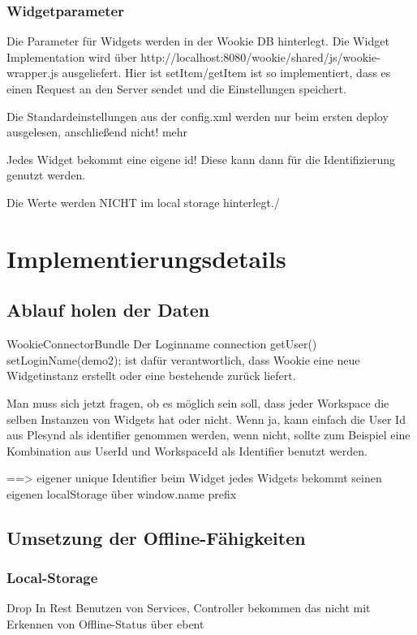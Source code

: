 \subsubsection{Widgetparameter}
Die Parameter für Widgets werden in der Wookie DB hinterlegt.
Die Widget Implementation wird über http://localhost:8080/wookie/shared/js/wookie-wrapper.js ausgeliefert.
Hier ist setItem/getItem ist so implementiert, dass es einen Request an den Server sendet und die Einstellungen speichert.

Die Standardeinstellungen aus der config.xml werden nur beim ersten deploy ausgelesen, anschließend nicht! mehr

Jedes Widget bekommt eine eigene id! Diese kann dann für die Identifizierung genutzt werden.

Die Werte werden NICHT im local storage hinterlegt./

\section{Implementierungsdetails}\label{section:implementierungsdetails}

\subsection{Ablauf holen der Daten}
WookieConnectorBundle
Der Loginname  connection getUser() setLoginName(demo2); ist dafür verantwortlich, dass Wookie eine neue Widgetinstanz erstellt oder eine bestehende zurück liefert.

Man muss sich jetzt fragen, ob es möglich sein soll, dass jeder Workspace die selben Instanzen von Widgets hat oder nicht.
Wenn ja, kann einfach die User Id aus Plesynd als identifier genommen werden, wenn nicht, sollte zum Beispiel eine Kombination aus UserId und WorkspaceId als Identifier benutzt werden.

==> eigener unique Identifier beim Widget
jedes Widgets bekommt seinen eigenen localStorage über window.name prefix

\subsection{Umsetzung der Offline-Fähigkeiten}

\subsubsection{Local-Storage}\label{section:local_storage_api}
Drop In Rest
Benutzen von Services, Controller bekommen das nicht mit
Erkennen von Offline-Status über ebent

